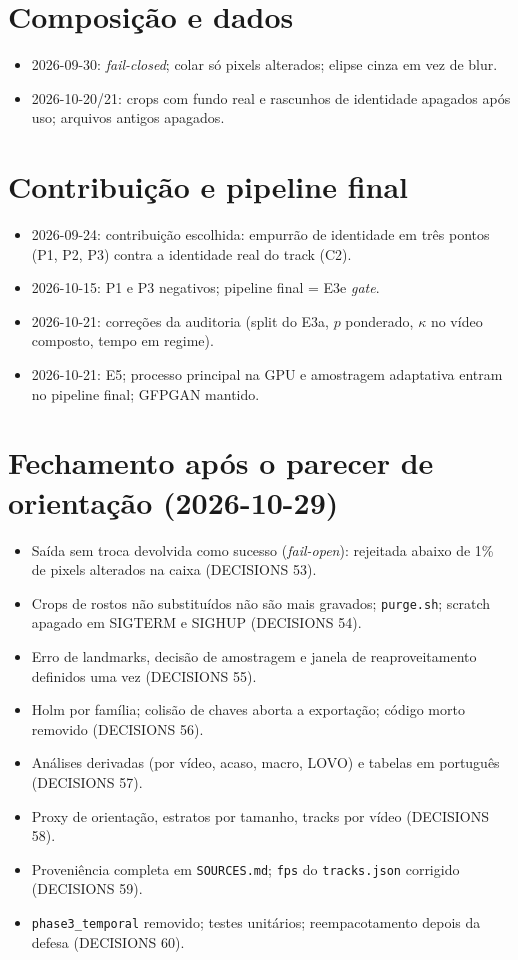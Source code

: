 \section{Composição e dados}
\begin{itemize}
\item 2026-09-30: \emph{fail-closed}; colar só pixels alterados; elipse cinza em vez de blur.
\item 2026-10-20/21: crops com fundo real e rascunhos de identidade apagados após uso; arquivos antigos apagados.
\end{itemize}

\section{Contribuição e pipeline final}
\begin{itemize}
\item 2026-09-24: contribuição escolhida: empurrão de identidade em três pontos (P1, P2, P3) contra a identidade real do track (C2).
\item 2026-10-15: P1 e P3 negativos; pipeline final = E3e \emph{gate}.
\item 2026-10-21: correções da auditoria (split do E3a, $p$ ponderado, $\kappa$ no vídeo composto, tempo em regime).
\item 2026-10-21: E5; processo principal na GPU e amostragem adaptativa entram no pipeline final; GFPGAN mantido.
\end{itemize}

\section{Fechamento após o parecer de orientação (2026-10-29)}
\begin{itemize}
\item Saída sem troca devolvida como sucesso (\emph{fail-open}): rejeitada abaixo de 1\% de pixels alterados na caixa (DECISIONS 53).
\item Crops de rostos não substituídos não são mais gravados; \texttt{purge.sh}; scratch apagado em SIGTERM e SIGHUP (DECISIONS 54).
\item Erro de landmarks, decisão de amostragem e janela de reaproveitamento definidos uma vez (DECISIONS 55).
\item Holm por família; colisão de chaves aborta a exportação; código morto removido (DECISIONS 56).
\item Análises derivadas (por vídeo, acaso, macro, LOVO) e tabelas em português (DECISIONS 57).
\item Proxy de orientação, estratos por tamanho, tracks por vídeo (DECISIONS 58).
\item Proveniência completa em \texttt{SOURCES.md}; \texttt{fps} do \texttt{tracks.json} corrigido (DECISIONS 59).
\item \texttt{phase3\_temporal} removido; testes unitários; reempacotamento depois da defesa (DECISIONS 60).
\end{itemize}

